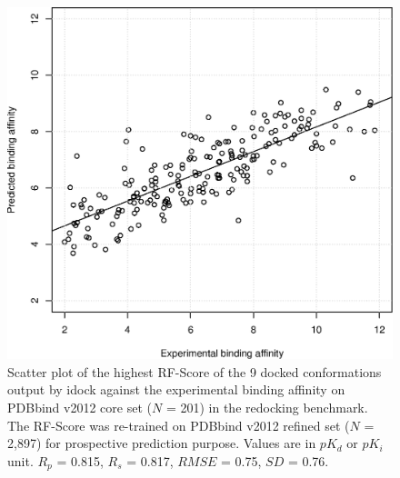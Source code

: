 \begin{figure}
\begin{center}
\includegraphics[width=\linewidth]{../istar/pK-idockConfsRFScoreMax.eps}
\end{center}
\caption{Scatter plot of the highest RF-Score of the 9 docked conformations output by idock against the experimental binding affinity on PDBbind v2012 core set ($N$ = 201) in the redocking benchmark. The RF-Score was re-trained on PDBbind v2012 refined set ($N$ = 2,897) for prospective prediction purpose. Values are in $pK_d$ or $pK_i$ unit. $R_p$ = 0.815, $R_s$ = 0.817, $RMSE$ = 0.75, $SD$ = 0.76.}
\label{istar:pK-idockConfsRFScoreMax}
\end{figure}

